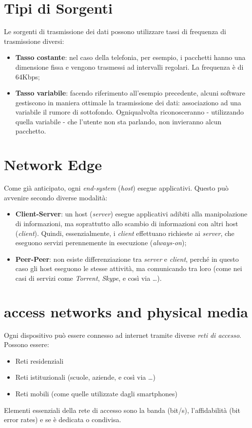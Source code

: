 \section{Tipi di Sorgenti}
Le sorgenti di trasmissione dei dati possono utilizzare tassi di frequenza di trasmissione diversi:
\begin{itemize}
    \item \textbf{Tasso costante}: nel caso della telefonia, per esempio, i pacchetti hanno una dimensione fissa e vengono trasmessi ad intervalli regolari. La frequenza è di 64Kbps;
    \item \textbf{Tasso variabile}: facendo riferimento all'esempio precedente, alcuni software gestiscono in maniera ottimale la trasmissione dei dati: associaziono ad una variabile il rumore di sottofondo. Ogniqualvolta riconosceranno - utilizzando quella variabile - che l'utente non sta parlando, non invieranno alcun pacchetto.
\end{itemize}

\section{Network Edge}
Come già anticipato, ogni \textit{end-system} (\textit{host}) esegue applicativi. Questo può avvenire secondo diverse modalità:
\begin{itemize}
	\item \textbf{Client-Server}: un host (\textit{server}) esegue applicativi adibiti alla manipolazione di informazioni, ma soprattutto allo scambio di informazioni con altri host (\textit{client}). Quindi, essenzialmente, i \textit{client} effettuano richieste ai \textit{server}, che eseguono servizi perennemente in esecuzione (\textit{always-on});
	\item \textbf{Peer-Peer}: non esiste differenziazione tra \textit{server} e \textit{client}, perché in questo caso gli host eseguono le stesse attività, ma comunicando tra loro (come nei casi di servizi come \textit{Torrent}, \textit{Skype}, e così via \ldots).
\end{itemize}

\section{access networks and physical media	}
Ogni dispositivo può essere connesso ad internet tramite diverse \textit{reti di accesso}. Possono essere:
\begin{itemize}
	\item Reti residenziali
	\item Reti istituzionali (scuole, aziende, e così via \ldots)
	\item Reti mobili (come quelle utilizzate dagli smartphones)
\end{itemize}
Elementi essenziali della rete di accesso sono la banda (bit/s), l'affidabilità (bit error rates) e se è dedicata o condivisa.

